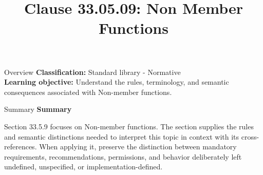 \documentclass[10pt,letterpaper]{article}
\title{Clause 33.05.09: Non Member Functions}
\author{}
\date{}
\begin{document}
\maketitle
\begin{CornellOverviewBox}{Overview}
\textbf{Classification:} Standard library - Normative\\[2pt]
\textbf{Learning objective:} Understand the rules, terminology, and semantic consequences associated with Non-member functions.
\end{CornellOverviewBox}\begin{CornellSummaryBox}{Summary}
{\sffamily\bfseries\color{Accent} Summary}\par\vspace{3pt}Section 33.5.9 focuses on Non-member functions. The section supplies the rules and semantic distinctions needed to interpret this topic in context with its cross-references. When applying it, preserve the distinction between mandatory requirements, recommendations, permissions, and behavior deliberately left undefined, unspecified, or implementation-defined.
\end{CornellSummaryBox}
\end{document}
